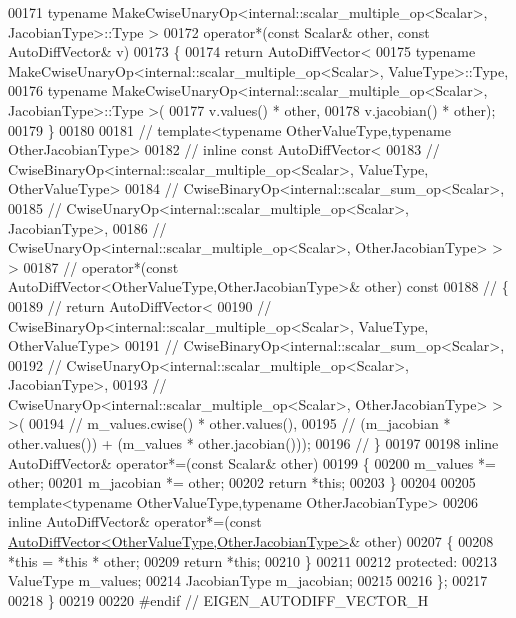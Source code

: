 \begin{DoxyCode}
00171       \textcolor{keyword}{typename} MakeCwiseUnaryOp<internal::scalar\_multiple\_op<Scalar>, JacobianType>::Type >
00172     operator*(\textcolor{keyword}{const} Scalar& other, \textcolor{keyword}{const} AutoDiffVector& v)
00173     \{
00174       \textcolor{keywordflow}{return} AutoDiffVector<
00175         \textcolor{keyword}{typename} MakeCwiseUnaryOp<internal::scalar\_multiple\_op<Scalar>, ValueType>::Type,
00176         \textcolor{keyword}{typename} MakeCwiseUnaryOp<internal::scalar\_multiple\_op<Scalar>, JacobianType>::Type >(
00177           v.values() * other,
00178           v.jacobian() * other);
00179     \}
00180 
00181 \textcolor{comment}{//     template<typename OtherValueType,typename OtherJacobianType>}
00182 \textcolor{comment}{//     inline const AutoDiffVector<}
00183 \textcolor{comment}{//       CwiseBinaryOp<internal::scalar\_multiple\_op<Scalar>, ValueType, OtherValueType>}
00184 \textcolor{comment}{//       CwiseBinaryOp<internal::scalar\_sum\_op<Scalar>,}
00185 \textcolor{comment}{//         CwiseUnaryOp<internal::scalar\_multiple\_op<Scalar>, JacobianType>,}
00186 \textcolor{comment}{//         CwiseUnaryOp<internal::scalar\_multiple\_op<Scalar>, OtherJacobianType> > >}
00187 \textcolor{comment}{//     operator*(const AutoDiffVector<OtherValueType,OtherJacobianType>& other) const}
00188 \textcolor{comment}{//     \{}
00189 \textcolor{comment}{//       return AutoDiffVector<}
00190 \textcolor{comment}{//         CwiseBinaryOp<internal::scalar\_multiple\_op<Scalar>, ValueType, OtherValueType>}
00191 \textcolor{comment}{//         CwiseBinaryOp<internal::scalar\_sum\_op<Scalar>,}
00192 \textcolor{comment}{//           CwiseUnaryOp<internal::scalar\_multiple\_op<Scalar>, JacobianType>,}
00193 \textcolor{comment}{//           CwiseUnaryOp<internal::scalar\_multiple\_op<Scalar>, OtherJacobianType> > >(}
00194 \textcolor{comment}{//             m\_values.cwise() * other.values(),}
00195 \textcolor{comment}{//             (m\_jacobian * other.values()) + (m\_values * other.jacobian()));}
00196 \textcolor{comment}{//     \}}
00197 
00198     \textcolor{keyword}{inline} AutoDiffVector& operator*=(\textcolor{keyword}{const} Scalar& other)
00199     \{
00200       m\_values *= other;
00201       m\_jacobian *= other;
00202       \textcolor{keywordflow}{return} *\textcolor{keyword}{this};
00203     \}
00204 
00205     \textcolor{keyword}{template}<\textcolor{keyword}{typename} OtherValueType,\textcolor{keyword}{typename} OtherJacobianType>
00206     \textcolor{keyword}{inline} AutoDiffVector& operator*=(\textcolor{keyword}{const} 
      \hyperlink{class_eigen_1_1_auto_diff_vector}{AutoDiffVector<OtherValueType,OtherJacobianType>}& other)
00207     \{
00208       *\textcolor{keyword}{this} = *\textcolor{keyword}{this} * other;
00209       \textcolor{keywordflow}{return} *\textcolor{keyword}{this};
00210     \}
00211 
00212   \textcolor{keyword}{protected}:
00213     ValueType m\_values;
00214     JacobianType m\_jacobian;
00215 
00216 \};
00217 
00218 \}
00219 
00220 \textcolor{preprocessor}{#endif // EIGEN\_AUTODIFF\_VECTOR\_H}
\end{DoxyCode}
